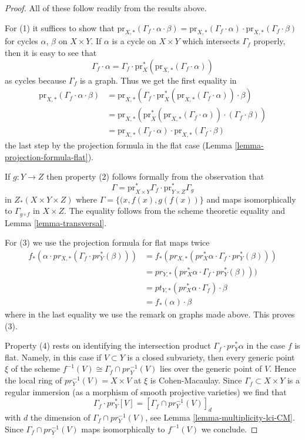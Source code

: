 \documentclass{stacks-project}
\theoremstyle{plain}
\theoremstyle{definition}
\theoremstyle{remark}
\numberwithin{equation}{subsection}
\begin{document}
\begin{proof}
All of these follow readily from the results above.

\medskip\noindent
For (1) it suffices to show that
$\text{pr}_{X,*}( \Gamma_f \cdot \alpha \cdot \beta) =
\text{pr}_{X,*}(\Gamma_f \cdot \alpha) \cdot
\text{pr}_{X,*}(\Gamma_f \cdot \beta)$
for cycles $\alpha$, $\beta$ on $X \times Y$. If $\alpha$ is a cycle on
$X \times Y$ which intersects $\Gamma_f$ properly, then it is easy
to see that
$$
\Gamma_f \cdot \alpha =
\Gamma_f \cdot \text{pr}_X^*(\text{pr}_{X,*}(\Gamma_f \cdot \alpha))
$$
as cycles because $\Gamma_f$ is a graph. Thus we get the first
equality in
\begin{align*}
\text{pr}_{X,*}(\Gamma_f \cdot \alpha \cdot \beta)
& =
\text{pr}_{X,*}(
\Gamma_f \cdot
\text{pr}_X^*(\text{pr}_{X,*}(\Gamma_f \cdot \alpha)) \cdot \beta) \\
& =
\text{pr}_{X,*}(\text{pr}_X^*(\text{pr}_{X,*}(\Gamma_f \cdot \alpha))
\cdot (\Gamma_f \cdot \beta)) \\
& =
\text{pr}_{X,*}(\Gamma_f \cdot \alpha) \cdot
\text{pr}_{X,*}(\Gamma_f \cdot \beta)
\end{align*}
the last step by the projection formula in the flat case
(Lemma \ref{lemma-projection-formula-flat}).

\medskip\noindent
If $g : Y \to Z$ then property (2) follows formally from the observation that
$$
\Gamma =
\text{pr}_{X \times Y}^*\Gamma_f \cdot
\text{pr}_{Y \times Z}^*\Gamma_g
$$
in $Z_*(X \times Y \times Z)$ where $\Gamma = \{(x, f(x), g(f(x))\}$
and maps isomorphically to $\Gamma_{g \circ f}$ in $X \times Z$.
The equality follows from the scheme theoretic equality and
Lemma \ref{lemma-transversal}.

\medskip\noindent
For (3) we use the projection formula for flat maps twice
\begin{align*}
f_*(\alpha \cdot pr_{X, *}(\Gamma_f \cdot pr_Y^*(\beta)))
& =
f_*(pr_{X, *}(pr_X^*\alpha \cdot \Gamma_f \cdot pr_Y^*(\beta))) \\
& =
pr_{Y, *}(pr_X^*\alpha \cdot \Gamma_f \cdot pr_Y^*(\beta))) \\
& =
pt_{Y, *}(pr_X^*\alpha \cdot \Gamma_f) \cdot \beta \\
& =
f_*(\alpha) \cdot \beta
\end{align*}
where in the last equality we use the remark on graphs made above.
This proves (3).

\medskip\noindent
Property (4) rests on identifying the intersection product
$\Gamma_f \cdot pr_Y^*\alpha$ in the case $f$ is flat. Namely, in this
case if $V \subset Y$ is a closed subvariety, then every generic point
$\xi$ of the scheme $f^{-1}(V) \cong \Gamma_f \cap pr_Y^{-1}(V)$
lies over the generic point of $V$. Hence the local ring of
$pr_Y^{-1}(V) = X \times V$ at $\xi$ is Cohen-Macaulay. Since
$\Gamma_f \subset X \times Y$ is a regular immersion (as a morphism of
smooth projective varieties) we find that
$$
\Gamma_f \cdot pr_Y^*[V] = [\Gamma_f \cap pr_Y^{-1}(V)]_d
$$
with $d$ the dimension of $\Gamma_f \cap pr_Y^{-1}(V)$, see
Lemma \ref{lemma-multiplicity-lci-CM}. Since $\Gamma_f \cap pr_Y^{-1}(V)$
maps isomorphically to $f^{-1}(V)$ we conclude.
\end{proof}
\end{document}
